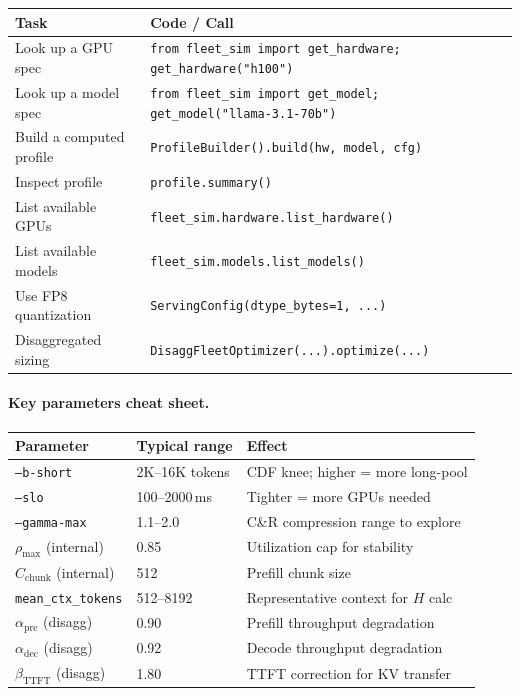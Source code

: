 \documentclass[11pt,a4paper]{article}
\begin{document}
\begin{center}
\begin{tabular}{lp{8cm}}
\toprule
Task & Code / Call \\
\midrule
Look up a GPU spec & \texttt{from fleet\_sim import get\_hardware; get\_hardware("h100")} \\
Look up a model spec & \texttt{from fleet\_sim import get\_model; get\_model("llama-3.1-70b")} \\
Build a computed profile & \texttt{ProfileBuilder().build(hw, model, cfg)} \\
Inspect profile & \texttt{profile.summary()} \\
List available GPUs & \texttt{fleet\_sim.hardware.list\_hardware()} \\
List available models & \texttt{fleet\_sim.models.list\_models()} \\
Use FP8 quantization & \texttt{ServingConfig(dtype\_bytes=1, ...)} \\
Disaggregated sizing & \texttt{DisaggFleetOptimizer(...).optimize(...)} \\
\bottomrule
\end{tabular}
\end{center}

\paragraph{Key parameters cheat sheet.}
\begin{center}
\begin{tabular}{lll}
\toprule
Parameter & Typical range & Effect \\
\midrule
\texttt{--b-short} & 2K--16K tokens & CDF knee; higher = more long-pool \\
\texttt{--slo} & 100--2000\,ms & Tighter = more GPUs needed \\
\texttt{--gamma-max} & 1.1--2.0 & C\&R compression range to explore \\
$\rho_{\max}$ (internal) & 0.85 & Utilization cap for stability \\
$C_{\text{chunk}}$ (internal) & 512 & Prefill chunk size \\
\texttt{mean\_ctx\_tokens} & 512--8192 & Representative context for $H$ calc \\
$\alpha_{\text{pre}}$ (disagg) & 0.90 & Prefill throughput degradation \\
$\alpha_{\text{dec}}$ (disagg) & 0.92 & Decode throughput degradation \\
$\beta_{\text{TTFT}}$ (disagg) & 1.80 & TTFT correction for KV transfer \\
\bottomrule
\end{tabular}
\end{center}
\end{document}
